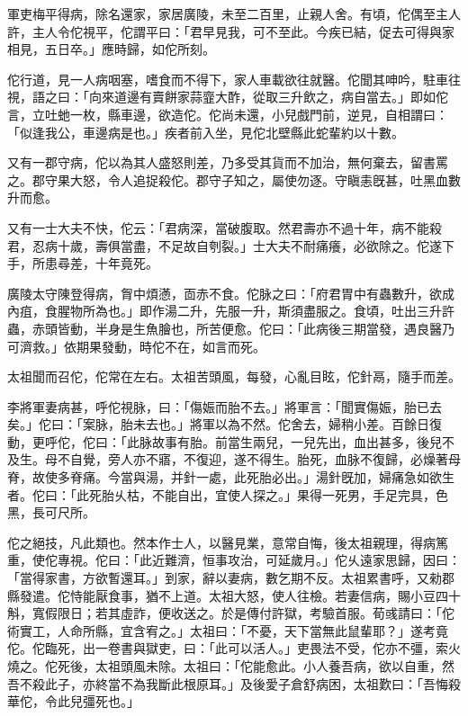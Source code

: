 \begin{pinyinscope}
 
 
 
 軍吏梅平得病，除名還家，家居廣陵，未至二百里，止親人舍。有頃，佗偶至主人許，主人令佗視平，佗謂平曰：「君早見我，可不至此。今疾已結，促去可得與家相見，五日卒。」應時歸，如佗所刻。
 
 
 
 
 佗行道，見一人病咽塞，嗜食而不得下，家人車載欲往就醫。佗聞其呻吟，駐車往視，語之曰：「向來道邊有賣餅家蒜韲大酢，從取三升飲之，病自當去。」即如佗言，立吐虵一枚，縣車邊，欲造佗。佗尚未還，小兒戲門前，逆見，自相謂曰：「似逢我公，車邊病是也。」疾者前入坐，見佗北壁縣此蛇輩約以十數。
 
 
 
 
 又有一郡守病，佗以為其人盛怒則差，乃多受其貨而不加治，無何棄去，留書罵之。郡守果大怒，令人追捉殺佗。郡守子知之，屬使勿逐。守瞋恚旣甚，吐黑血數升而愈。
 
 
 
 
 又有一士大夫不快，佗云：「君病深，當破腹取。然君壽亦不過十年，病不能殺君，忍病十歲，壽俱當盡，不足故自刳裂。」士大夫不耐痛癢，必欲除之。佗遂下手，所患尋差，十年竟死。
 
 
 
 
 廣陵太守陳登得病，胷中煩懣，靣赤不食。佗脉之曰：「府君胃中有蟲數升，欲成內疽，食腥物所為也。」即作湯二升，先服一升，斯須盡服之。食頃，吐出三升許蟲，赤頭皆動，半身是生魚膾也，所苦便愈。佗曰：「此病後三期當發，遇良醫乃可濟救。」依期果發動，時佗不在，如言而死。
 
 
太祖聞而召佗，佗常在左右。太祖苦頭風，每發，心亂目眩，佗針鬲，隨手而差。
 
 
 
 
 李將軍妻病甚，呼佗視脉，曰：「傷娠而胎不去。」將軍言：「聞實傷娠，胎已去矣。」佗曰：「案脉，胎未去也。」將軍以為不然。佗舍去，婦稍小差。百餘日復動，更呼佗，佗曰：「此脉故事有胎。前當生兩兒，一兒先出，血出甚多，後兒不及生。母不自覺，旁人亦不寤，不復迎，遂不得生。胎死，血脉不復歸，必燥著母脊，故使多脊痛。今當與湯，并針一處，此死胎必出。」湯針旣加，婦痛急如欲生者。佗曰：「此死胎乆枯，不能自出，宜使人探之。」果得一死男，手足完具，色黑，長可尺所。
 
 
 
 
 佗之絕技，凡此類也。然本作士人，以醫見業，意常自悔，後太祖親理，得病篤重，使佗專視。佗曰：「此近難濟，恒事攻治，可延歲月。」佗乆遠家思歸，因曰：「當得家書，方欲暫還耳。」到家，辭以妻病，數乞期不反。太祖累書呼，又勑郡縣發遣。佗恃能厭食事，猶不上道。太祖大怒，使人往檢。若妻信病，賜小豆四十斛，寬假限日；若其虛詐，便收送之。於是傳付許獄，考驗首服。荀彧請曰：「佗術實工，人命所縣，宜含宥之。」太祖曰：「不憂，天下當無此鼠輩耶？」遂考竟佗。佗臨死，出一卷書與獄吏，曰：「此可以活人。」吏畏法不受，佗亦不彊，索火燒之。佗死後，太祖頭風未除。太祖曰：「佗能愈此。小人養吾病，欲以自重，然吾不殺此子，亦終當不為我斷此根原耳。」及後愛子倉舒病困，太祖歎曰：「吾悔殺華佗，令此兒彊死也。」
 

\end{pinyinscope}
